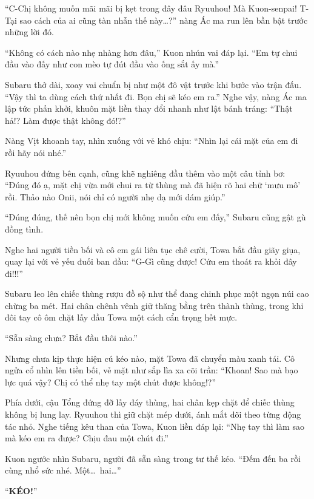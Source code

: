 \documentclass[../main.tex]{subfiles}
\begin{document}
``C-Chị không muốn mãi mãi bị kẹt trong đây đâu Ryuuhou! Mà Kuon-senpai! T-Tại sao cách của ai cũng tàn nhẫn thế này\dots?'' nàng Ác ma run lên bần bật trước những lời đó.

``Không có cách nào nhẹ nhàng hơn đâu,'' Kuon nhún vai đáp lại. ``Em tự chui đầu vào đấy như con mèo tự đút đầu vào ống sắt ấy mà.''

Subaru thở dài, xoay vai chuẩn bị như một đô vật trước khi bước vào trận đấu. ``Vậy thì ta dùng cách thứ nhất đi. Bọn chị sẽ kéo em ra.'' Nghe vậy, nàng Ác ma lập tức phấn khởi, khuôn mặt liền thay đổi nhanh như lật bánh tráng: ``Thật hả!? Làm được thật không đó!?''

Nàng Vịt khoanh tay, nhìn xuống với vẻ khó chịu: ``Nhìn lại cái mặt của em đi rồi hãy nói nhé.''

Ryuuhou đứng bên cạnh, cũng khẽ nghiêng đầu thêm vào một câu tỉnh bơ: ``Đúng đó ạ, mặt chị vừa mới chui ra từ thùng mà đã hiện rõ hai chữ `mưu mô' rồi. Thảo nào Onii, nói chỉ có người nhẹ dạ mới dám giúp.''

``Đúng đúng, thế nên bọn chị mới không muốn cứu em đấy,'' Subaru cũng gật gù đồng tình.

Nghe hai người tiền bối và cô em gái liên tục chê cười, Towa bắt đầu giãy giụa, quay lại với vẻ yếu đuối ban đầu: ``G-Gì cũng được! Cứu em thoát ra khỏi đây đi!!!''

\ct

Subaru leo lên chiếc thùng rượu đồ sộ như thể đang chinh phục một ngọn núi cao chừng ba mét. Hai chân chênh vênh giữ thăng bằng trên thành thùng, trong khi đôi tay cô ôm chặt lấy đầu Towa một cách cẩn trọng hết mực.


``Sẵn sàng chưa? Bắt đầu thôi nào.''

Nhưng chưa kịp thực hiện cú kéo nào, mặt Towa đã chuyển màu xanh tái. Cô ngửa cổ nhìn lên tiền bối, vẻ mặt như sắp lìa xa cõi trần: ``Khoan! Sao mà bạo lực quá vậy? Chị có thể nhẹ tay một chút được không!?''

Phía dưới, cậu Tổng đứng đỡ lấy đáy thùng, hai chân kẹp chặt để chiếc thùng không bị lung lay. Ryuuhou thì giữ chặt mép dưới, ánh mắt dõi theo từng động tác nhỏ. Nghe tiếng kêu than của Towa, Kuon liền đáp lại: ``Nhẹ tay thì làm sao mà kéo em ra được? Chịu đau một chút đi.''

Kuon ngước nhìn Subaru, người đã sẵn sàng trong tư thế kéo. ``Đếm đến ba rồi cùng nhổ sức nhé. Một\dots\ hai\dots''

``\textbf{KÉO!}''
\end{document}
